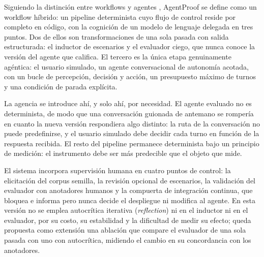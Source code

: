 Siguiendo la distinción entre workflows y agentes \cite{anthropic2024agents}, AgentProof se define como un workflow híbrido: un pipeline determinista cuyo flujo de control reside por completo en código, con la cognición de un modelo de lenguaje delegada en tres puntos. Dos de ellos son transformaciones de una sola pasada con salida estructurada: el inductor de escenarios y el evaluador ciego, que nunca conoce la versión del agente que califica. El tercero es la única etapa genuinamente agéntica: el usuario simulado, un agente conversacional de autonomía acotada, con un bucle de percepción, decisión y acción, un presupuesto máximo de turnos y una condición de parada explícita.
\par\vspace{6pt}
La agencia se introduce ahí, y solo ahí, por necesidad. El agente evaluado no es determinista, de modo que una conversación guionada de antemano se rompería en cuanto la nueva versión respondiera algo distinto: la ruta de la conversación no puede predefinirse, y el usuario simulado debe decidir cada turno en función de la respuesta recibida. El resto del pipeline permanece determinista bajo un principio de medición: el instrumento debe ser más predecible que el objeto que mide.
\par\vspace{6pt}
El sistema incorpora supervisión humana en cuatro puntos de control: la elicitación del corpus semilla, la revisión opcional de escenarios, la validación del evaluador con anotadores humanos y la compuerta de integración continua, que bloquea e informa pero nunca decide el despliegue ni modifica al agente. En esta versión no se emplea autocrítica iterativa (\textit{reflection}) ni en el inductor ni en el evaluador, por su costo, su estabilidad y la dificultad de medir su efecto; queda propuesta como extensión una ablación que compare el evaluador de una sola pasada con uno con autocrítica, midiendo el cambio en su concordancia con los anotadores.
\par

